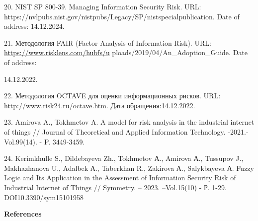 \begin{references}
20. NIST SP 800-39. Managing Information Security Risk. URL:\\
https://nvlpubs.nist.gov/nistpubs/Legacy/SP/nistspecialpublication. Date
of address: 14.12.2024.

21. Методология FAIR (Factor Analysis of Information Risk). URL:
\url{https://www.risklens.com/hubfs/u}
ploads/2019/04/An\_Adoption\_Guide. Date of address:

14.12.2022.

22. Методология OCTAVE для оценки информационных рисков. URL:\\
http://www.risk24.ru/octave.htm. Дата обращения:14.12.2022.

23. Amirova A., Tokhmetov A. A model for risk analysis in the industrial
internet of things // Journal of Theoretical and Applied Information
Technology. -2021.- Vol.99(14). - P. 3449-3459.

24. Kerimkhulle S., Dildebayeva Zh., Tokhmetov А., Amirova А., Tussupov
J., Makhazhanova U., Adalbek А., Taberkhan R., Zakirova А., Salykbayeva
А. Fuzzy Logic and Its Application in the Assessment of Information
Security Risk of Industrial Internet of Things // Symmetry. -- 2023.
--Vol.15(10) - Р. 1-29. DOI10.3390/sym15101958
\end{references}

\begin{center}
{\bfseries References}
\end{center}

